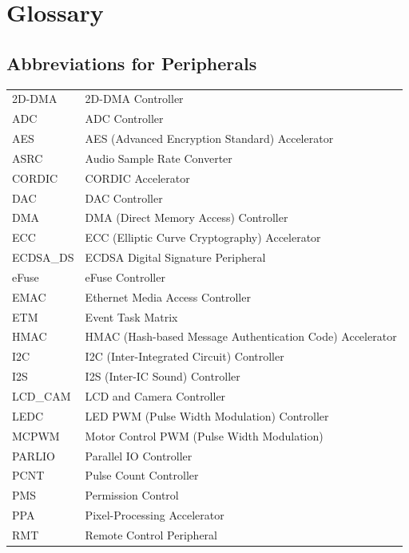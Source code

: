 \section*{Glossary}\label{glossary}
\rhead{\Navigation}

\subsection*{Abbreviations for Peripherals}

\begin{longtable}[c]{ R{3cm} p{12cm} }

2D-DMA & 2D-DMA Controller \\
ADC & ADC Controller \\
AES & AES (Advanced Encryption Standard) Accelerator \\
ASRC & Audio Sample Rate Converter \\
CORDIC & CORDIC Accelerator \\
DAC & DAC Controller \\
DMA & DMA (Direct Memory Access) Controller \\
ECC & ECC (Elliptic Curve Cryptography) Accelerator  \\
ECDSA\_DS & ECDSA Digital Signature Peripheral  \\
eFuse & eFuse Controller \\
EMAC & Ethernet Media Access Controller \\
ETM & Event Task Matrix \\
HMAC & HMAC (Hash-based Message Authentication Code) Accelerator \\
I2C & I2C (Inter-Integrated Circuit) Controller \\
I2S & I2S (Inter-IC Sound) Controller \\
LCD\_CAM & LCD and Camera Controller \\
LEDC & LED PWM (Pulse Width Modulation) Controller \\
MCPWM & Motor Control PWM (Pulse Width Modulation) \\
PARLIO & Parallel IO Controller \\
PCNT & Pulse Count Controller \\
PMS & Permission Control \\
PPA & Pixel-Processing Accelerator \\
RMT & Remote Control Peripheral \\

\end{longtable}
